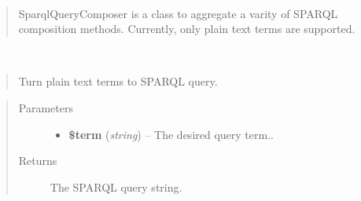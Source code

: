 \documentclass[letterpaper,10pt,english]{sphinxmanual}
\begin{document}
\begin{fulllineitems}
\label{docs/api:SparqlQueryComposer}~\begin{quote}

SparqlQueryComposer is a class to aggregate a varity of SPARQL composition methods. Currently, only plain text terms are supported.
\end{quote}

\begin{fulllineitems}
\label{docs/api:SparqlQueryComposer::term2Sparql}~\begin{quote}

Turn plain text terms to SPARQL query.
\end{quote}
\begin{quote}\begin{description}
\item[{Parameters}] \leavevmode\begin{itemize}
\item {} 
\textbf{\$term} (\emph{string}) -- The desired query term..

\end{itemize}

\item[{Returns}] \leavevmode
The SPARQL query string.

\end{description}\end{quote}

\end{fulllineitems}


\end{fulllineitems}

\end{document}
